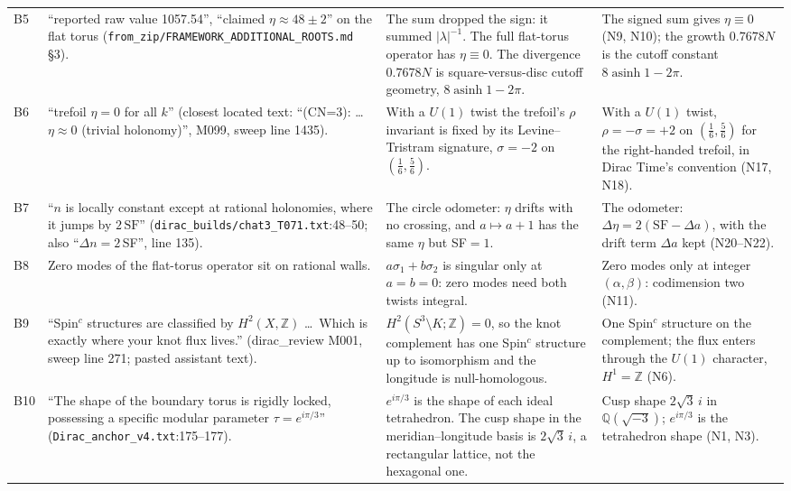 \documentclass[11pt]{article}
\theoremstyle{definition}
\begin{document}
\begin{longtable}{@{}L{0.06\textwidth}L{0.34\textwidth}L{0.25\textwidth}L{0.25\textwidth}@{}}
B5 & ``reported raw value 1057.54'', ``claimed $\eta\approx48\pm2$'' on the flat torus (\texttt{from\_\allowbreak{}zip/FRAMEWORK\_\allowbreak{}ADDITIONAL\_\allowbreak{}ROOTS.md} \S3). & The sum dropped the sign: it summed $|\lambda|^{-1}$. The full flat-torus operator has $\eta\equiv0$. The divergence $0.7678N$ is square-versus-disc cutoff geometry, $8\operatorname{asinh}1-2\pi$. & The signed sum gives $\eta\equiv0$ (N9, N10); the growth $0.7678N$ is the cutoff constant $8\operatorname{asinh}1-2\pi$.\\
B6 & ``trefoil $\eta=0$ for all $k$'' (closest located text: ``(CN=3): \dots $\eta\approx0$ (trivial holonomy)'', M099, sweep line 1435). & With a $U(1)$ twist the trefoil's $\rho$ invariant is fixed by its Levine--Tristram signature, $\sigma=-2$ on $(\tfrac16,\tfrac56)$. & With a $U(1)$ twist, $\rho=-\sigma=+2$ on $(\tfrac16,\tfrac56)$ for the right-handed trefoil, in Dirac Time's convention (N17, N18).\\
B7 & ``$n$ is locally constant except at rational holonomies, where it jumps by $2\,\mathrm{SF}$'' (\texttt{dirac\_\allowbreak{}builds/chat3\_\allowbreak{}T071.txt}:48--50; also ``$\Delta n=2\,$SF'', line 135). & The circle odometer: $\eta$ drifts with no crossing, and $a\mapsto a+1$ has the same $\eta$ but SF$=1$. & The odometer: $\Delta\eta=2(\mathrm{SF}-\Delta a)$, with the drift term $\Delta a$ kept (N20--N22).\\
B8 & Zero modes of the flat-torus operator sit on rational walls. & $a\sigma_1+b\sigma_2$ is singular only at $a=b=0$: zero modes need both twists integral. & Zero modes only at integer $(\alpha,\beta)$: codimension two (N11).\\
B9 & ``Spin$^c$ structures are classified by $H^2(X,\mathbb Z)$ \dots\ Which is exactly where your knot flux lives.'' (dirac\_\allowbreak{}review M001, sweep line 271; pasted assistant text). & $H^2(S^3\setminus K;\mathbb Z)=0$, so the knot complement has one Spin$^c$ structure up to isomorphism and the longitude is null-homologous. & One Spin$^c$ structure on the complement; the flux enters through the $U(1)$ character, $H^1=\mathbb Z$ (N6).\\
B10 & ``The shape of the boundary torus is rigidly locked, possessing a specific modular parameter $\tau=e^{i\pi/3}$'' (\texttt{Dirac\_\allowbreak{}anchor\_\allowbreak{}v4.txt}:175--177). & $e^{i\pi/3}$ is the shape of each ideal tetrahedron. The cusp shape in the meridian--longitude basis is $2\sqrt3\,i$, a rectangular lattice, not the hexagonal one. & Cusp shape $2\sqrt3\,i$ in $\mathbb Q(\sqrt{-3})$; $e^{i\pi/3}$ is the tetrahedron shape (N1, N3).\\

\end{longtable}
\end{document}

